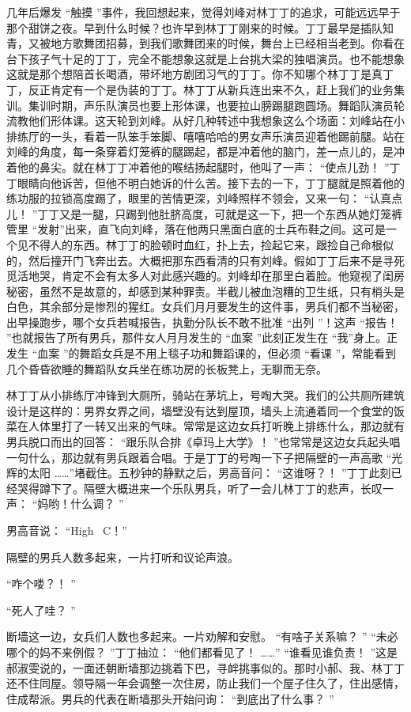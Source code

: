 \documentclass[12pt,twoside,openany]{book}
\begin{document}
几年后爆发 “触摸 ”事件，我回想起来，觉得刘峰对林丁丁的追求，可能远远早于那个甜饼之夜。早到什么时候？也许早到林丁丁刚来的时候。丁丁最早是插队知青，又被地方歌舞团招募，到我们歌舞团来的时候，舞台上已经相当老到。你看在台下孩子气十足的丁丁，完全不能想象这就是上台挑大梁的独唱演员。也不能想象这就是那个想陪首长喝酒，带坏地方剧团习气的丁丁。你不知哪个林丁丁是真丁丁，反正肯定有一个是伪装的丁丁。林丁丁从新兵连出来不久，赶上我们的业务集训。集训时期，声乐队演员也要上形体课，也要拉山膀踢腿跑圆场。舞蹈队演员轮流教他们形体课。这天轮到刘峰。从好几种转述中我想象这么个场面：刘峰站在小排练厅的一头，看着一队笨手笨脚、嘻嘻哈哈的男女声乐演员迎着他踢前腿。站在刘峰的角度，每一条穿着灯笼裤的腿踢起，都是冲着他的脑门，差一点儿的，是冲着他的鼻尖。就在林丁丁冲着他的喉结扬起腿时，他叫了一声： “使点儿劲！ ”丁丁眼睛向他诉苦，但他不明白她诉的什么苦。接下去的一下，丁丁腿就是照着他的练功服的拉锁高度踢了，眼里的苦情更深，刘峰照样不领会，又来一句： “认真点儿！ ”丁丁又是一腿，只踢到他肚脐高度，可就是这一下，把一个东西从她灯笼裤管里 “发射”出来，直飞向刘峰，落在他两只黑面白底的士兵布鞋之间。这可是一个见不得人的东西。林丁丁的脸顿时血红，扑上去，捡起它来，跟捡自己命根似的，然后撞开门飞奔出去。大概把那东西看清的只有刘峰。假如丁丁后来不是寻死觅活地哭，肯定不会有太多人对此感兴趣的。刘峰却在那里白着脸。他窥视了闺房秘密，虽然不是故意的，却感到某种罪责。半截儿被血泡糟的卫生纸，只有梢头是白色，其余部分是惨烈的猩红。女兵们月月要发生的这件事，男兵们都不当秘密，出早操跑步，哪个女兵若喊报告，执勤分队长不敢不批准 “出列 ”！这声 “报告！ ”也就报告了所有男兵，那件女人月月发生的 “血案 ”此刻正发生在 “我”身上。正发生 “血案 ”的舞蹈女兵是不用上毯子功和舞蹈课的，但必须 “看课 ”，常能看到几个昏昏欲睡的舞蹈队女兵坐在练功房的长板凳上，无聊而无奈。

林丁丁从小排练厅冲锋到大厕所，骑站在茅坑上，号啕大哭。我们的公共厕所建筑设计是这样的：男界女界之间，墙壁没有达到屋顶，墙头上流通着同一个食堂的饭菜在人体里打了一转又出来的气味。常常是这边女兵打听晚上排练什么，那边就有男兵脱口而出的回答： “跟乐队合排《卓玛上大学》！ ”也常常是这边女兵起头唱一句什么，那边就有男兵跟着合唱。于是丁丁的号啕一下子把隔壁的一声高歌 “光辉的太阳 ……”堵截住。五秒钟的静默之后，男高音问： “这谁呀？！ ”丁丁此刻已经哭得蹲下了。隔壁大概进来一个乐队男兵，听了一会儿林丁丁的悲声，长叹一声： “妈哟！什么调？ ”

男高音说： “High~ C！”

隔壁的男兵人数多起来，一片打听和议论声浪。

“咋个喽？！ ”

“死人了哇？ ”

断墙这一边，女兵们人数也多起来。一片劝解和安慰。 “有啥子关系嘛？ ” “未必哪个的妈不来例假？ ”丁丁抽泣： “他们都看见了！ ……” “谁看见谁负责！ ”这是郝淑雯说的，一面还朝断墙那边挑着下巴，寻衅挑事似的。那时小郝、我、林丁丁还不住同屋。领导隔一年会调整一次住房，防止我们一个屋子住久了，住出感情，住成帮派。男兵的代表在断墙那头开始问询： “到底出了什么事？ ”
\end{document}
